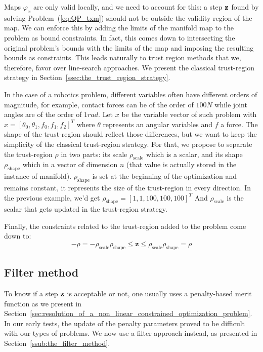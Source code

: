Maps $\varphi_{x}$ are only valid locally, and we need to account for this: a step ${\bf z}$ found by solving Problem~(\ref{eq:QP_txm}) should not be outside the validity region of the map.
We can enforce this by adding the limits of the manifold map to the problem as bound constraints.
In fact, this comes down to intersecting the original problem's bounds with the limits of the map and imposing the resulting bounds as constraints.
This leads naturally to trust region methods that we, therefore, favor over line-search approaches.
We present the classical trust-region strategy in Section~\ref{ssec:the_trust_region_strategy}.

In the case of a robotics problem, different variables often have different orders of magnitude, for example, contact forces can be of the order of $100N$ while joint angles are of the order of $1rad$.
Let $x$ be the variable vector of such problem with $x={[\theta_0, \theta_1, f_0, f_1, f_2]}^T$ where $\theta$ represents an angular variables and $f$ a force.
The shape of the trust-region should reflect those differences, but we want to keep the simplicity of the classical trust-region strategy.
For that, we propose to separate the trust-region $\rho$ in two parts: its scale $\rho_\text{scale}$ which is a scalar, and its shape $\rho_\text{shape}$ which in a vector of dimension $n$ (that value is actually stored in the instance of manifold).
$\rho_\text{shape}$ is set at the beginning of the optimization and remains constant, it represents the size of the trust-region in every direction.
In the previous example, we'd get ${\rho_\text{shape}} = {[1,1,100,100,100]}^T$
And $\rho_\text{scale}$ is the scalar that gets updated in the trust-region strategy.

Finally, the constraints related to the trust-region added to the problem come down to:
\begin{equation}
  -\rho = -\rho_\text{scale}\rho_\text{shape} \leq \mathbf{z} \leq \rho_\text{scale}\rho_\text{shape} = \rho
\end{equation}

\subsection{Filter method}
\label{sub:filter_method}

To know if a step ${\bf z}$ is acceptable or not, one usually uses a penalty-based merit function as we present in Section~\ref{sec:resolution_of_a_non_linear_constrained_optimization_problem}.
In our early tests, the update of the penalty parameters proved to be difficult with our types of problems.
We now use a filter approach instead, as presented in Section~\ref{ssub:the_filter_method}.

